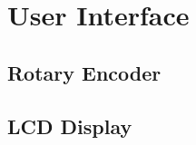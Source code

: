 \setchapterpreamble[u]{\margintoc}

\chapter{User Interface}

\section{Rotary Encoder}

\section{LCD Display}